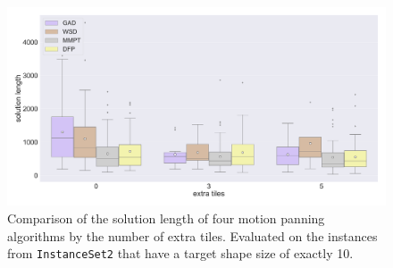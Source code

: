 \begin{figure}[htpb]
\centering
\includegraphics[width=\textwidth]{figures/plots/heuristic_solvers_i2/solution_length_over_extra_tiles.pdf}
\caption[Solution length of several planners by number of extra tiles] {Comparison of the solution length of four motion panning algorithms by the number of extra tiles. Evaluated on the instances from \texttt{InstanceSet2} that have a target shape size of exactly 10.}
\label{fig:i2_extra_tiles_solution_length}
\end{figure}
